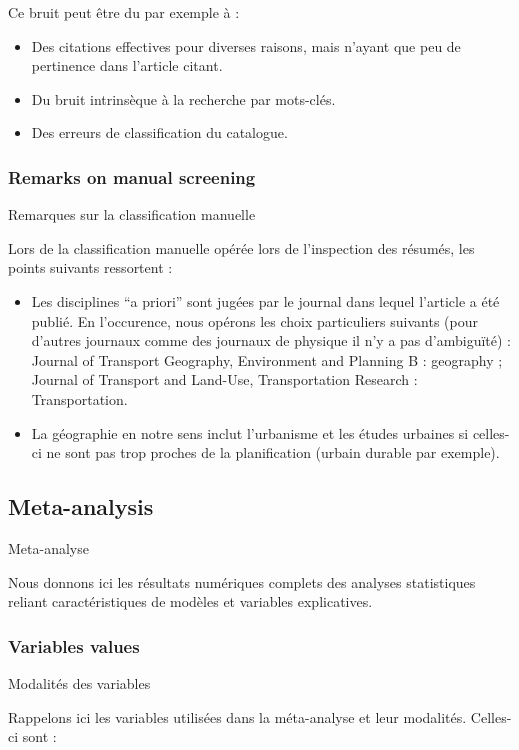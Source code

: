 Ce bruit peut être du par exemple à :
\begin{itemize}
	\item Des citations effectives pour diverses raisons, mais n'ayant que peu de pertinence dans l'article citant.
	\item Du bruit intrinsèque à la recherche par mots-clés.
	\item Des erreurs de classification du catalogue.
\end{itemize}



\subsubsection{Remarks on manual screening}{Remarques sur la classification manuelle}

Lors de la classification manuelle opérée lors de l'inspection des résumés, les points suivants ressortent :

\begin{itemize}
	\item Les disciplines ``a priori'' sont jugées par le journal dans lequel l'article a été publié. En l'occurence, nous opérons les choix particuliers suivants (pour d'autres journaux comme des journaux de physique il n'y a pas d'ambiguïté) : Journal of Transport Geography, Environment and Planning B : geography ; Journal of Transport and Land-Use, Transportation Research : Transportation.
	\item La géographie en notre sens inclut l'urbanisme et les études urbaines si celles-ci ne sont pas trop proches de la planification (urbain durable par exemple).
\end{itemize}






\subsection{Meta-analysis}{Meta-analyse}

Nous donnons ici les résultats numériques complets des analyses statistiques reliant caractéristiques de modèles et variables explicatives.


\subsubsection{Variables values}{Modalités des variables}

Rappelons ici les variables utilisées dans la méta-analyse et leur modalités. Celles-ci sont :

